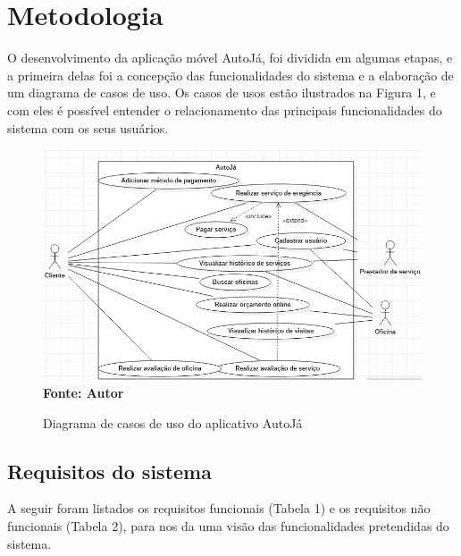 \section{\esp Metodologia}

O desenvolvimento da aplicação móvel AutoJá, foi dividida em algumas etapas, e a primeira delas foi a concepção das funcionalidades do sistema e a elaboração de um diagrama de casos de uso. Os casos de usos estão ilustrados na Figura 1, e com eles é possível entender o relacionamento das principais funcionalidades do sistema com os seus usuários.

\begin{figure}[!ht]
	\centering	
	\caption[\hspace{0.1cm}]{Diagrama de casos de uso do aplicativo AutoJá}
	\vspace{-0.4cm}
	\includegraphics[width=1\textwidth]{figuras/caso_de_uso_autoja.png}
	 \vspace{-0.2cm}
	\\\textbf{\footnotesize Fonte: Autor }
	\label{fig:figura1}
\end{figure}
\vspace{-0.5cm}

\subsection{Requisitos do sistema}

A seguir foram listados os requisitos funcionais (Tabela 1) e os requisitos não funcionais (Tabela 2), para nos da uma visão das funcionalidades pretendidas do sistema.

